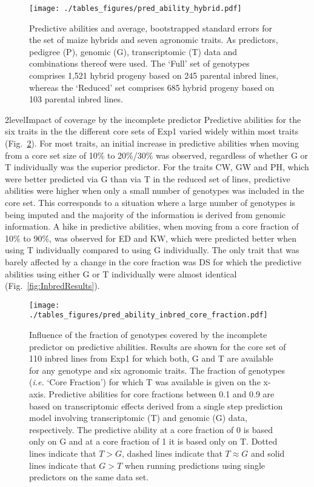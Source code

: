 \documentclass[12pt,titlepage]{article}
\begin{document}
\begin{figure}[H]
\centering
  \texttt{[image: ./tables\_figures/pred\_ability\_hybrid.pdf]}
  \caption{
    Predictive abilities and average, bootstrapped standard errors for the set
    of maize hybrids and seven agronomic traits.
    As predictors, pedigree (P), genomic (G), transcriptomic (T) data and 
    combinations thereof were used.
    The `Full' set of genotypes comprises 1,521 hybrid progeny based on 245
    parental inbred lines, whereas the `Reduced' set comprises 685 hybrid
    progeny based on 103 parental inbred lines.
  }
\label{fig:HybridResults}
\end{figure}





\Genetics2level{Impact of coverage by the incomplete predictor}
Predictive abilities for the six traits in the the different core sets of Exp1
varied widely within most traits (Fig.~\ref{fig:core-results}).
For most traits, an initial increase in predictive abilities when moving
from a core set size of 10\% to 20\%/30\% was observed, regardless of whether G
or T individually was the superior predictor.
For the traits CW, GW and PH, which were better predicted via G than via T in
the reduced set of lines, predictive abilities were higher when only a small
number of genotypes was included in the core set.
This corresponds to a situation where a large number of genotypes is being 
imputed and the majority of the information is derived from genomic information.
A hike in predictive abilities, when moving from a core fraction of 10\% to 
90\%, was observed for ED and KW, which were predicted better when using T
individually compared to using G individually.
The only trait that was barely affected by a change in the core fraction was DS
for which the predictive abilities using either G or T individually were almost
identical (Fig.~\ref{fig:InbredResults}).

\begin{figure}[H]
  \centering
  \texttt{[image: ./tables\_figures/pred\_ability\_inbred\_core\_fraction.pdf]}
  \caption{
  Influence of the fraction of genotypes covered by the incomplete predictor
  on predictive abilities.
  Results are shown for the core set of 110 inbred lines from Exp1 for
  which both, G and T are available for any genotype and six agronomic traits.
  The fraction of genotypes (\textit{i.e.} `Core Fraction') for which
  T was available is given on the x-axis.
  Predictive abilities for core fractions between 0.1 and 0.9 are based on
  transcriptomic effects derived from a single step prediction model involving
  transcriptomic (T) and genomic (G) data, respectively.
  The predictive ability at a core fraction of 0 is based only on G and at a
  core fraction of 1 it is based only on T.
  Dotted lines indicate that $T > G$, dashed lines indicate that $T \approx G$
  and solid lines indicate that $G > T$ when running predictions using single
  predictors on the same data set.
  }
\label{fig:core-results}
\end{figure}
\end{document}
